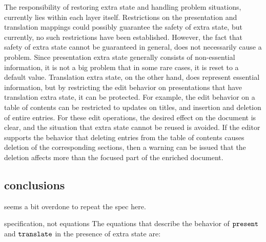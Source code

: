The responsibility of restoring extra state and handling problem situations, currently lies within each layer itself. Restrictions on the presentation and translation mappings could possibly guarantee the safety of extra state, but currently, no such restrictions have been established. However, the fact that safety of extra state cannot be guaranteed in general, does not necessarily cause a problem. Since presentation extra state generally consists of non-essential information, it is not a big problem that in some rare cases, it is reset to a default value.  Translation extra state, on the other hand, does represent essential information, but by restricting the edit behavior on presentations that have translation extra state, it can be protected. For example, the edit behavior on a table of contents can be restricted to updates on titles, and insertion and deletion of entire entries. For these edit operations, the desired effect on the document is clear, and the situation that extra state cannot be reused is avoided. If the editor supports the behavior that deleting entries from the table of contents causes deletion of the corresponding sections, then a warning can be issued that the deletion affects more than the focused part of the enriched document. 





%																
\subsection{conclusions}

\bc seems a bit overdone to repeat the spec here.

specification, not equations
The equations that describe the behavior of ${\tt present}$ and ${\tt translate}$ in the presence of extra state are:

